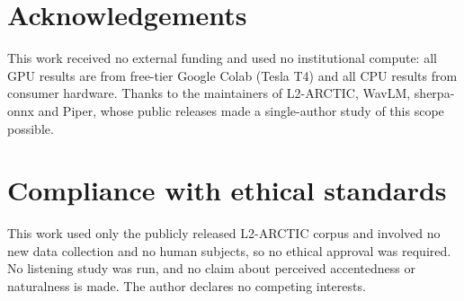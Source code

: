 \documentclass{article}
\begin{document}
\section{Acknowledgements}

This work received no external funding and used no institutional compute: all
GPU results are from free-tier Google Colab (Tesla T4) and all CPU results from
consumer hardware. Thanks to the maintainers of L2-ARCTIC, WavLM, sherpa-onnx
and Piper, whose public releases made a single-author study of this scope
possible.

\section{Compliance with ethical standards}

This work used only the publicly released L2-ARCTIC corpus and involved no new
data collection and no human subjects, so no ethical approval was required. No
listening study was run, and no claim about perceived accentedness or
naturalness is made. The author declares no competing interests.



\end{document}
